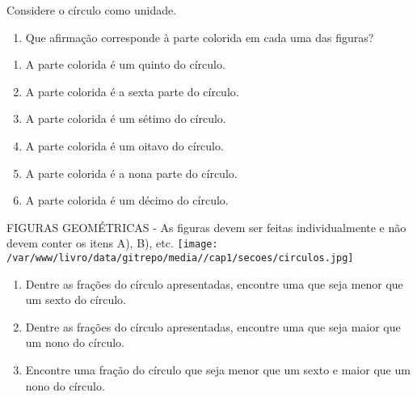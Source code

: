 \documentclass[a4paper,12pt,twoside]{book}
\begin{document}
Considere o círculo como unidade. 
\begin{enumerate} [\quad a)] %
  \item      Que afirmação corresponde à parte colorida em cada uma das figuras?  
\end{enumerate} %
\mbox{} \newline 
\begin{enumerate} [\quad a)] %
  \item    	A parte colorida é um quinto do círculo.
  \item    	A parte colorida é a sexta parte do círculo.
  \item    	A parte colorida é um sétimo do círculo.
  \item    	A parte colorida é um oitavo do círculo.
  \item    	A parte colorida é a nona parte do círculo.
  \item    	A parte colorida é um décimo do círculo.
\end{enumerate} %
\mbox{} \newline  \begin{imagem*}[breakable]{}{}   FIGURAS GEOMÉTRICAS - As figuras devem ser feitas individualmente e não devem conter os itens A), B), etc.  
    \texttt{[image: /var/www/livro/data/gitrepo/media//cap1/secoes/circulos.jpg]}  
\end{imagem*}\mbox{} \newline 
\begin{enumerate} [\quad a)] %
  \item     Dentre as frações do círculo apresentadas, encontre uma que seja menor que um sexto do círculo.
  \item     Dentre as frações do círculo apresentadas, encontre uma que seja maior que um nono do círculo.
  \item     Encontre uma fração do círculo que seja menor que um sexto e maior que um nono do círculo.
\end{enumerate} %
\end{document}
